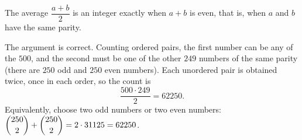 The average $\dfrac{a+b}{2}$ is an integer exactly when $a+b$ is even, that is, when $a$ and $b$ have the same parity.

The argument is correct. Counting ordered pairs, the first number can be any of the $500$, and the second must be one of the other $249$ numbers of the same parity (there are $250$ odd and $250$ even numbers). Each unordered pair is obtained twice, once in each order, so the count is
\[\dfrac{500\cdot249}{2}=\boxed{62250}.\]
Equivalently, choose two odd numbers or two even numbers: $\dbinom{250}{2}+\dbinom{250}{2}=2\cdot31125=62250$.
